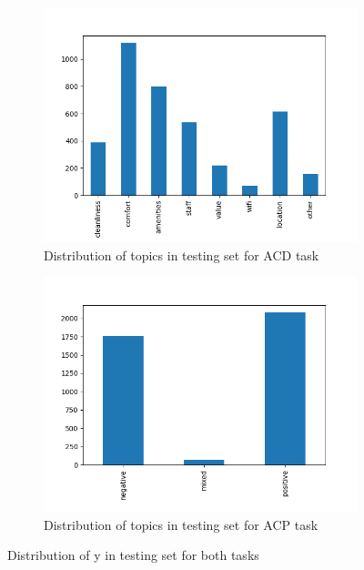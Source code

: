 \documentclass{article}
\begin{document}
            \begin{figure}
		    \centering
		    \begin{subfigure}{.5\textwidth}
  		        \centering
 		        \includegraphics[width=\textwidth]{imgs/acd_y_test_historgram.png}
  		        \caption{Distribution of topics in testing set for ACD task}
  		        \label{acd_y_test_historgram}
		    \end{subfigure}%
		    \begin{subfigure}{.5\textwidth}
 		        \centering
 		        \includegraphics[width=\textwidth]{imgs/acp_y_test_historgram.png}
 		        \caption{Distribution of topics in testing set for ACP task}
 		        \label{acp_y_test_historgram}
		    \end{subfigure}
		    \caption{Distribution of y in testing set for both tasks}
		    \label{y_test_histograms}
	    \end{figure}
\end{document}
